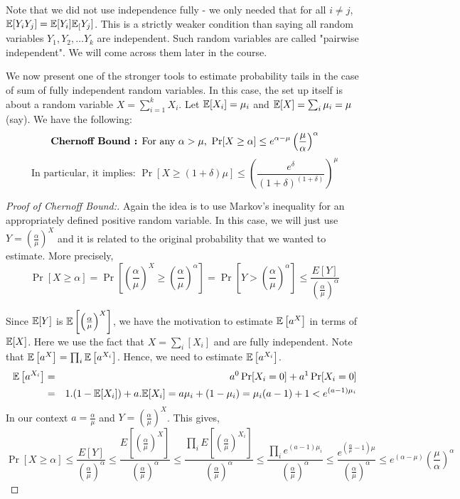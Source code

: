 \begin{description}
\begin{remark}
Note that we did not use independence fully - we only needed that for all $i \ne j$, ${\mathbb E}[Y_iY_j] = {\mathbb E}[Y_i]{\mathbb E}_[Y_j]$. This is a strictly weaker condition than saying all random variables $Y_1, Y_2, \ldots Y_k$ are independent. Such random variables are called "pairwise independent". We will come across them later in the course.
\end{remark}

We now present one of the stronger tools to estimate probability tails in the case of sum of fully independent random variables. In this case, the set up itself is about a random variable $X = \sum_{i=1}^k X_i$. Let ${\mathbb E}[X_i] = \mu_i$ and ${\mathbb E}[X] = \sum_i \mu_i = \mu$ (say). We have the following:
$$\textrm{{\bf Chernoff Bound :} For any $\alpha > \mu$, } \Pr[X \ge \alpha] \le e^{\alpha-\mu}\left(\frac{\mu}{\alpha}\right)^\alpha$$
$$\textrm{In particular, it implies: } \Pr[X \ge (1+\delta)\mu] \le \left( \frac{e^{\delta}}{\left(1+\delta\right)^{(1+\delta)}} \right)^\mu$$

\begin{proof}[Proof of Chernoff Bound:]
Again the idea is to use Markov's inequality for an appropriately defined positive random variable. In this case, we will just use $Y = \left(\frac{\alpha}{\mu}\right)^X$ and it is related to the original probability that we wanted to estimate. More precisely, 
$$\Pr[X \ge \alpha] = \Pr\left[\left(\frac{\alpha}{\mu}\right)^X \ge \left(\frac{\alpha}{\mu}\right)^\alpha\right] = \Pr\left[Y > \left(\frac{\alpha}{\mu}\right)^\alpha\right] \le \frac{E[Y]}{\left(\frac{\alpha}{\mu}\right)^\alpha}$$

Since ${\mathbb E}[Y]$ is ${\mathbb E}\left[\left(\frac{\alpha}{\mu}\right)^X\right]$, we have the motivation to estimate ${\mathbb E}\left[a^X\right]$ in terms of ${\mathbb E}[X]$. Here we use the fact that $X = \sum_i[X_i]$ and are fully independent. Note that ${\mathbb E}\left[a^X\right] =  \prod_i {\mathbb E}\left[a^{X_i}\right]$. Hence, we need to estimate ${\mathbb E}\left[a^{X_i}\right]$.
\begin{eqnarray*}
{\mathbb E}\left[a^{X_i}\right] & = & a^0\Pr[X_i=0]+a^1\Pr[X_i=0] \\
& = & 1.(1-{\mathbb E}[X_i])+a.{\mathbb E}[X_i] = a\mu_i+(1-\mu_i) = \mu_i(a-1)+1 < e^{(a-1)\mu_i}
\end{eqnarray*}
In our context $a = \frac{\alpha}{\mu}$ and $Y = \left(\frac{\alpha}{\mu}\right)^X$. This gives, 
$$\Pr[X \ge \alpha] 
\le \frac{E[Y]}{\left(\frac{\alpha}{\mu}\right)^\alpha}
\le \frac{E\left[\left(\frac{\alpha}{\mu}\right)^X\right]}{\left(\frac{\alpha}{\mu}\right)^\alpha}
\le \frac{\prod_i E\left[\left(\frac{\alpha}{\mu}\right)^{X_i}\right]}{\left(\frac{\alpha}{\mu}\right)^\alpha}
\le \frac{\prod_i e^{(a-1)\mu_i}}{\left(\frac{\alpha}{\mu}\right)^\alpha}
\le \frac{e^{(\frac{\alpha}{\mu}-1)\mu}}{\left(\frac{\alpha}{\mu}\right)^\alpha}
\le e^{(\alpha-\mu)}\left(\frac{\mu}{\alpha}\right)^\alpha
$$
\end{proof}
\end{description}

